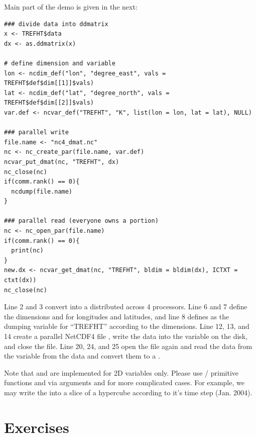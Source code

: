 Main part of the demo is given in the next:
\begin{lstlisting}[language=rr,title=nc4\_dmat]
### divide data into ddmatrix
x <- TREFHT$data
dx <- as.ddmatrix(x)

# define dimension and variable
lon <- ncdim_def("lon", "degree_east", vals = TREFHT$def$dim[[1]]$vals)
lat <- ncdim_def("lat", "degree_north", vals = TREFHT$def$dim[[2]]$vals)
var.def <- ncvar_def("TREFHT", "K", list(lon = lon, lat = lat), NULL)

### parallel write
file.name <- "nc4_dmat.nc"
nc <- nc_create_par(file.name, var.def)
ncvar_put_dmat(nc, "TREFHT", dx)
nc_close(nc)
if(comm.rank() == 0){
  ncdump(file.name)
}

### parallel read (everyone owns a portion)
nc <- nc_open_par(file.name)
if(comm.rank() == 0){
  print(nc)
}
new.dx <- ncvar_get_dmat(nc, "TREFHT", bldim = bldim(dx), ICTXT = ctxt(dx))
nc_close(nc)
\end{lstlisting}

Line 2 and 3 convert  into a  distributed
across 4 processors. Line 6 and 7 define the dimensions
 and  for longitudes and latitudes, and line 8
defines  as the dumping variable for ``TREFHT'' according
to the dimensions.
 Line 12, 13, and 14 create a parallel NetCDF4 file
,
write the data into the variable on the disk, and close the file.
Line 20, 24, and 25 open the file again and read the data from the
variable from the data and convert them to a
.

Note that  and  are implemented
for 2D variables only. Please use / primitive functions
 and  via arguments 
and  for more complicated cases. For example, we may write
the  into a slice of a hypercube according to it's time step
(Jan. 2004).


\section{Exercises}
\label{sec:pbdNCDF4_exercise}

